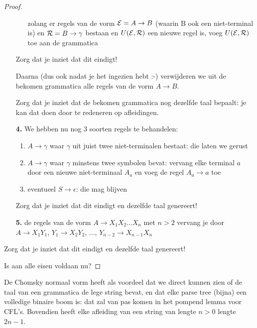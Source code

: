 \begin{proof}
\begin{enumerate}
\begin{itemize}
\item[]
zolang er regels van de vorm ${\cal E} = A \rightarrow B$ (waarin B
ook een niet-terminal is) en ${\cal R} = B \rightarrow \gamma$ bestaan
en $U({\cal E},{\cal R})$ een nieuwe regel is, voeg $U({\cal E},{\cal
R})$ toe aan de grammatica
\end{itemize}
Zorg dat je inziet dat dit eindigt!


Daarna (dus ook nadat je het ingezien hebt :-) verwijderen we uit de
bekomen grammatica alle regels van de vorm $A \rightarrow B$.


Zorg dat je inziet dat de bekomen grammatica nog dezelfde taal
bepaalt: je kan dat doen door te redeneren op afleidingen.


\item[{\bf 4.}] We hebben nu nog 3 soorten regels te behandelen:
\begin{enumerate}
\item 
$A \rightarrow \gamma$ waar $\gamma$ uit juist twee niet-terminalen
bestaat: die laten we gerust

\item 
$A \rightarrow \gamma$ waar $\gamma$ minstens twee symbolen bevat:
vervang elke terminal $a$ door een nieuwe niet-terminaal $A_a$ en voeg
de regel $A_a \rightarrow a$ toe

\item 
eventueel $S \rightarrow \epsilon$: die mag blijven

\end{enumerate}
Zorg dat je inziet dat dit eindigt en dezelfde taal genereert!


\item[{\bf 5.}] de regels van de vorm $A \rightarrow X_1X_2...X_n$ met $n > 2$
    vervang je door \\ $A \rightarrow X_1Y_1$, $Y_1 \rightarrow X_2Y_2$, ...,
$Y_{n-2} \rightarrow X_{n-1}X_n$

\end{enumerate}

Zorg dat je inziet dat dit eindigt en dezelfde taal genereert!


Is aan alle eisen voldaan nu?
\end{proof}


De Chomsky normaal vorm heeft als voordeel dat we direct kunnen zien
of de taal van een grammatica de lege string bevat, en dat elke parse
tree (bijna) een volledige binaire boom is: dat zal van pas komen in
het pompend lemma voor CFL's. Bovendien heeft elke afleiding van een
string van lengte $n > 0$ lengte $2n-1$. 



